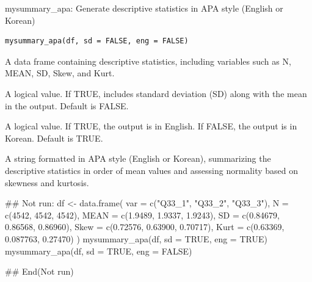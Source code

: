 \documentclass[a4paper]{book}
\begin{document}
%
\begin{Description}
mysummary\_apa: Generate descriptive statistics in APA style (English or Korean)
\end{Description}
%
\begin{Usage}
\begin{verbatim}
mysummary_apa(df, sd = FALSE, eng = FALSE)
\end{verbatim}
\end{Usage}
%
\begin{Arguments}
\begin{ldescription}
\item[\code{df}] A data frame containing descriptive statistics, including variables such as N, MEAN, SD, Skew, and Kurt.

\item[\code{sd}] A logical value. If TRUE, includes standard deviation (SD) along with the mean in the output. Default is FALSE.

\item[\code{eng}] A logical value. If TRUE, the output is in English. If FALSE, the output is in Korean. Default is TRUE.
\end{ldescription}
\end{Arguments}
%
\begin{Value}
A string formatted in APA style (English or Korean), summarizing the descriptive statistics in order of mean values and assessing normality based on skewness and kurtosis.
\end{Value}
%
\begin{Examples}
\begin{ExampleCode}
\#\# Not run: 
df <- data.frame(
  var = c("Q33_1", "Q33_2", "Q33_3"),
  N = c(4542, 4542, 4542),
  MEAN = c(1.9489, 1.9337, 1.9243),
  SD = c(0.84679, 0.86568, 0.86960),
  Skew = c(0.72576, 0.63900, 0.70717),
  Kurt = c(0.63369, 0.087763, 0.27470)
)
mysummary_apa(df, sd = TRUE, eng = TRUE)
mysummary_apa(df, sd = TRUE, eng = FALSE)

## End(Not run)
\end{ExampleCode}
\end{Examples}
\end{document}
